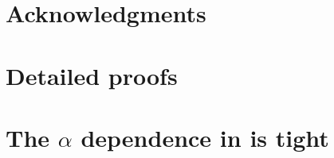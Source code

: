 \documentclass[webpdf,contemporary,small,namedate]{oup-authoring-template}%
\theoremstyle{thmstyleone}%
\begin{document}
\section{Acknowledgments}


\clearpage
\newpage


\clearpage
\newpage
\begin{appendices}


\section{Detailed proofs}


\section{The $\alpha$ dependence in  is tight}


\clearpage
\newpage



\end{appendices}
\end{document}

